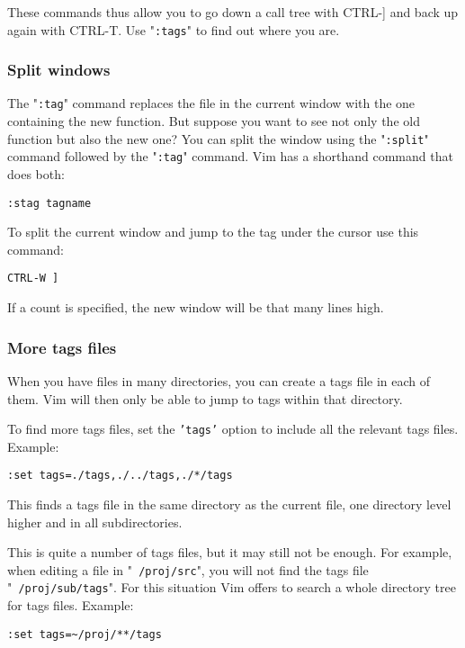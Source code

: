 These commands thus allow you to go down a call tree with CTRL-] and back up again with CTRL-T.
Use "\texttt{:tags}" to find out where you are.
\subsubsection{Split windows}
The "\texttt{:tag}" command replaces the file in the current window with the one containing the new function.
But suppose you want to see not only the old function but also the new one?  You can split the window using the "\texttt{:split}" command followed by the "\texttt{:tag}" command.
Vim has a shorthand command that does both:

\begin{Verbatim}[samepage=true]
 :stag tagname
\end{Verbatim}

To split the current window and jump to the tag under the cursor use this command:

\begin{Verbatim}[samepage=true]
 CTRL-W ]
\end{Verbatim}

If a count is specified, the new window will be that many lines high.
\subsubsection{More tags files}
When you have files in many directories, you can create a tags file in each of them.
Vim will then only be able to jump to tags within that directory.

To find more tags files, set the \texttt{'tags'} option to include all the relevant tags files.
Example:

\begin{Verbatim}[samepage=true]
 :set tags=./tags,./../tags,./*/tags
\end{Verbatim}

This finds a tags file in the same directory as the current file, one directory level higher and in all subdirectories.

This is quite a number of tags files, but it may still not be enough.
For example, when editing a file in "\texttt{~/proj/src}", you will not find the tags file "\texttt{~/proj/sub/tags}".
For this situation Vim offers to search a whole directory tree for tags files.
Example:

\begin{Verbatim}[samepage=true]
 :set tags=~/proj/**/tags
\end{Verbatim}
